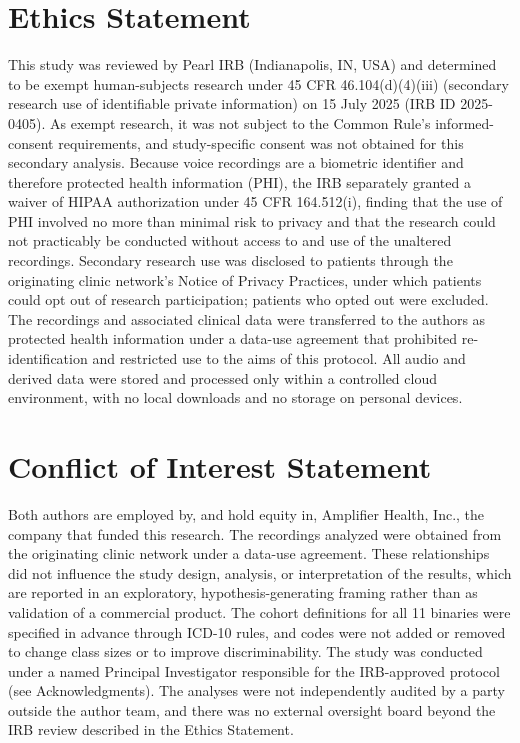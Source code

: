 \documentclass[utf8]{FrontiersinHarvard} %
\begin{document}

\section*{Ethics Statement}
This study was reviewed by Pearl IRB (Indianapolis, IN, USA) and determined to be exempt human-subjects research under 45 CFR 46.104(d)(4)(iii) (secondary research use of identifiable private information) on 15 July 2025 (IRB ID 2025-0405). As exempt research, it was not subject to the Common Rule's informed-consent requirements, and study-specific consent was not obtained for this secondary analysis. Because voice recordings are a biometric identifier and therefore protected health information (PHI), the IRB separately granted a waiver of HIPAA authorization under 45 CFR 164.512(i), finding that the use of PHI involved no more than minimal risk to privacy and that the research could not practicably be conducted without access to and use of the unaltered recordings. Secondary research use was disclosed to patients through the originating clinic network's Notice of Privacy Practices, under which patients could opt out of research participation; patients who opted out were excluded. The recordings and associated clinical data were transferred to the authors as protected health information under a data-use agreement that prohibited re-identification and restricted use to the aims of this protocol. All audio and derived data were stored and processed only within a controlled cloud environment, with no local downloads and no storage on personal devices.

\section*{Conflict of Interest Statement}

Both authors are employed by, and hold equity in, Amplifier Health, Inc., the company that funded this research. The recordings analyzed were obtained from the originating clinic network under a data-use agreement. These relationships did not influence the study design, analysis, or interpretation of the results, which are reported in an exploratory, hypothesis-generating framing rather than as validation of a commercial product. The cohort definitions for all 11 binaries were specified in advance through ICD-10 rules, and codes were not added or removed to change class sizes or to improve discriminability. The study was conducted under a named Principal Investigator responsible for the IRB-approved protocol (see Acknowledgments). The analyses were not independently audited by a party outside the author team, and there was no external oversight board beyond the IRB review described in the Ethics Statement.
\end{document}
